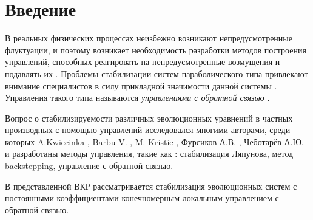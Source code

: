 \chapter*{Введение}


В реальных физических процессах неизбежно возникают непредусмотренные 
флуктуации, и поэтому возникает необходимость разработки методов построения 
управлений, способных реагировать на непредусмотренные возмущения и подавлять 
их \cite{Furs}. Проблемы стабилизации систем параболического типа привлекают внимание 
специалистов в силу прикладной значимости данной системы \cite{Chebotarev}. 
Управления такого типа называются \emph{управлениями с обратной связью} \cite{KS}.

Вопрос о стабилизируемости различных эволюционных уравнений в частных 
производных с помощью управлений исследовался многими авторами, среди которых 
A.Kwiecinka \cite{KWCK}, Barbu V. \cite{Barbu}, M. Kristic
\cite{KMV, KS}, Фурсиков А.В. \cite{Furs}, Чеботарёв А.Ю. 
\cite{Chebotarev, ChebotarevBS, ChebotarevMGT} и разработаны методы управления, 
такие как : стабилизация Ляпунова, метод backstepping, управление с обратной связью.

В представленной ВКР рассматривается стабилизация эволюционных систем с 
постоянными коэффициентами конечномерным локальным управлением с обратной связью.
